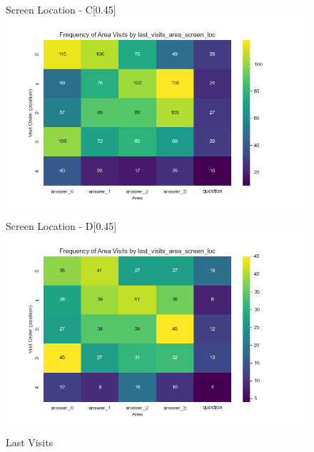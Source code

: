 \documentclass{article}
\begin{document}
\begin{figure}[H]
  \begin{subcaptionbox}{Screen Location - C\label{fig:sl_c}}[0.45\textwidth]
    {\centering\includegraphics[width=\linewidth]{plots/visits/matrix_first_visits_last_visits_area_screen_loc_gatherers_C (hunters).png}}
  \end{subcaptionbox}
  \hfill
  \begin{subcaptionbox}{Screen Location - D\label{fig:sl_d}}[0.45\textwidth]
    {\centering\includegraphics[width=\linewidth]{plots/visits/matrix_first_visits_last_visits_area_screen_loc_gatherers_D (hunters).png}}
  \end{subcaptionbox}
  
  \caption{Last Visits}
  \label{fig:fourimages4}
\end{figure}





\end{document}
